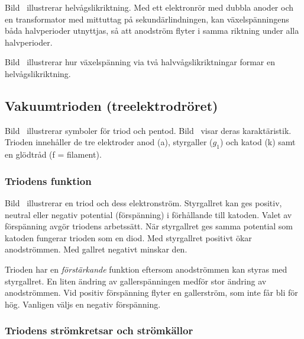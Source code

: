 Bild~ illustrerar helvågslikriktning.
Med ett elektronrör med dubbla anoder och en transformator med mittuttag på
sekundärlindningen, kan växelspänningens båda halvperioder utnyttjas, så att
anodström flyter i samma riktning under alla halvperioder.

Bild~ illustrerar hur växelspänning via två
halvvågslikriktningar formar en helvågslikriktning.

\subsection{Vakuumtrioden (treelektrodröret)}

Bild~ illustrerar symboler för triod och pentod.
Bild~ visar deras karaktäristik.
Trioden innehåller de tre elektroder anod (a), styrgaller (\(g_1\)) och katod
(k) samt en glödtråd (f = filament).




\subsubsection{Triodens funktion}

Bild~ illustrerar en triod och dess elektronström.
Styrgallret kan ges positiv, neutral eller negativ potential (förspänning) i
förhållande till katoden.
Valet av förspänning avgör triodens arbetssätt.
När styrgallret ges samma potential som katoden fungerar trioden som en diod.
Med styrgallret positivt ökar anodströmmen.
Med gallret negativt minskar den.

Trioden har en \emph{förstärkande} funktion eftersom anodströmmen kan styras med
styrgallret.
En liten ändring av gallerspänningen medför stor ändring av anodströmmen.
Vid positiv förspänning flyter en gallerström, som inte får bli för hög.
Vanligen väljs en negativ förspänning.

\subsubsection{Triodens strömkretsar och strömkällor}

